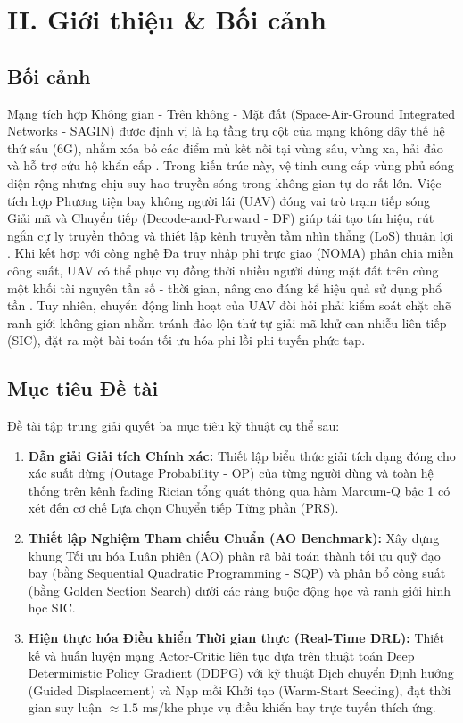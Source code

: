 \section*{II. Giới thiệu \& Bối cảnh}

\subsection*{Bối cảnh}
Mạng tích hợp Không gian - Trên không - Mặt đất (Space-Air-Ground Integrated Networks - SAGIN) được định vị là hạ tầng trụ cột của mạng không dây thế hệ thứ sáu (6G), nhằm xóa bỏ các điểm mù kết nối tại vùng sâu, vùng xa, hải đảo và hỗ trợ cứu hộ khẩn cấp \cite{liu2018space, zeng2019accessing}. Trong kiến trúc này, vệ tinh cung cấp vùng phủ sóng diện rộng nhưng chịu suy hao truyền sóng trong không gian tự do rất lớn. Việc tích hợp Phương tiện bay không người lái (UAV) đóng vai trò trạm tiếp sóng Giải mã và Chuyển tiếp (Decode-and-Forward - DF) giúp tái tạo tín hiệu, rút ngắn cự ly truyền thông và thiết lập kênh truyền tầm nhìn thẳng (LoS) thuận lợi \cite{wu2018joint}. Khi kết hợp với công nghệ Đa truy nhập phi trực giao (NOMA) phân chia miền công suất, UAV có thể phục vụ đồng thời nhiều người dùng mặt đất trên cùng một khối tài nguyên tần số - thời gian, nâng cao đáng kể hiệu quả sử dụng phổ tần \cite{ding2017survey}. Tuy nhiên, chuyển động linh hoạt của UAV đòi hỏi phải kiểm soát chặt chẽ ranh giới không gian nhằm tránh đảo lộn thứ tự giải mã khử can nhiễu liên tiếp (SIC), đặt ra một bài toán tối ưu hóa phi lồi phi tuyến phức tạp.

\subsection*{Mục tiêu Đề tài}
Đề tài tập trung giải quyết ba mục tiêu kỹ thuật cụ thể sau:
\begin{enumerate}[label=\textbf{\arabic*.}]
    \item \textbf{Dẫn giải Giải tích Chính xác:} Thiết lập biểu thức giải tích dạng đóng cho xác suất dừng (Outage Probability - OP) của từng người dùng và toàn hệ thống trên kênh fading Rician tổng quát thông qua hàm Marcum-Q bậc 1 \cite{alouini2001digital} có xét đến cơ chế Lựa chọn Chuyển tiếp Từng phần (PRS).
    \item \textbf{Thiết lập Nghiệm Tham chiếu Chuẩn (AO Benchmark):} Xây dựng khung Tối ưu hóa Luân phiên (AO) phân rã bài toán thành tối ưu quỹ đạo bay (bằng Sequential Quadratic Programming - SQP) và phân bổ công suất (bằng Golden Section Search) dưới các ràng buộc động học và ranh giới hình học SIC.
    \item \textbf{Hiện thực hóa Điều khiển Thời gian thực (Real-Time DRL):} Thiết kế và huấn luyện mạng Actor-Critic liên tục dựa trên thuật toán Deep Deterministic Policy Gradient (DDPG) \cite{lillicrap2015continuous} với kỹ thuật Dịch chuyển Định hướng (Guided Displacement) và Nạp mồi Khởi tạo (Warm-Start Seeding), đạt thời gian suy luận $\approx 1.5$ ms/khe phục vụ điều khiển bay trực tuyến thích ứng.
\end{enumerate}
